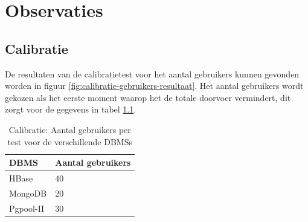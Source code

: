 \chapter{Observaties}

\section{Calibratie}
De resultaten van de calibratietest voor het aantal gebruikers kunnen gevonden worden in figuur \ref{fig:calibratie-gebruikers-resultaat}. Het aantal gebruikers wordt gekozen als het eerste moment waarop het de totale doorvoer vermindert, dit zorgt voor de gegevens in tabel \ref{table:calibratie-gebruikers-resultaat}. 

\begin{table}[h!]
	\centering
	\begin{tabular}{l| l }
		\textbf{\gls{DBMS}} & Aantal gebruikers \\
		\hline
		HBase & 40 \\
		MongoDB & 20\\
		Pgpool-II & 30\\
	\end{tabular}
	\caption{Calibratie: Aantal gebruikers per test voor de verschillende \glspl{DBMS}}
	\label{table:calibratie-gebruikers-resultaat}
\end{table}

